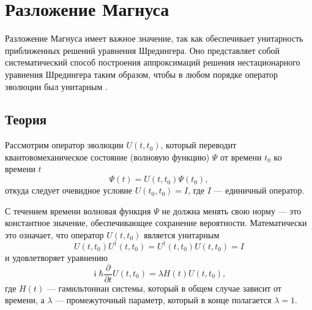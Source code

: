 \documentclass[12pt]{article}
\DeclareMathOperator\Iunit{i}
\renewcommand\imath\Iunit
\begin{document}
\section{Разложение Магнуса}

Разложение Магнуса имеет важное значение, так как обеспечивает унитарность
приближенных решений уравнения Шредингера. Оно представляет собой
систематический способ построения аппроксимаций решения нестационарного
уравнения Шредингера таким образом, чтобы в любом порядке оператор эволюции был
унитарным \cite{Magnus}.

\subsection{Теория}

Рассмотрим оператор эволюции $U(t,t_0)$, который переводит квантовомеханическое
состояние (волновую функцию) $\Psi$ от времени $t_0$ ко времени $t$
%
\begin{equation}
  \Psi(t)=U(t,t_0)\Psi(t_0),
\end{equation}
откуда следует очевидное условие $U(t_0,t_0)=I$, где $I$ — единичный оператор.

С течением времени волновая функция $\Psi$ не должна менять свою норму — это
константное значение, обеспечивающее сохранение вероятности. Математически это
означает, что оператор $U(t,t_0)$ является унитарным
\begin{equation}
  U(t,t_0)U^\dagger(t,t_0)=U^\dagger(t,t_0)U(t,t_0)=I
\end{equation}
и удовлетворяет уравнению
\begin{equation}\label{HU}
  \imath\hbar\frac{\partial}{\partial t} U(t,t_0)=\lambda H(t)U(t,t_0),
\end{equation}
где $H(t)$ — гамильтониан системы, который в общем случае зависит от времени, а
$\lambda$ — промежуточный параметр, который в конце полагается $\lambda=1$.
\end{document}
